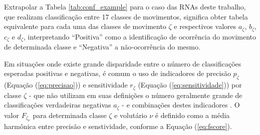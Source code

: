 \begin{table}[htb]
\end{table}

Extrapolar a Tabela \ref{tab:conf_example} para o caso das RNAs deste trabalho, que realizam classificação entre 17 classes de movimentos, significa obter tabela equivalente para cada uma das classes de movimento $\zeta$ e respectivos valores $a_\zeta$, $b_\zeta$, $c_\zeta$ e $d_\zeta$, interpretando ``Positiva'' como a identificação de ocorrência do movimento de determinada classe e ``Negativa'' a não-ocorrência do mesmo. 



Em situações onde existe grande disparidade entre o número de classificações esperadas positivas e negativas, é comum o uso de indicadores de precisão $p_\zeta$ (Equação (\ref{eq:precisao})) e sensitividade $r_\zeta$ (Equação (\ref{eq:sensitividade})) por classe $\zeta$ - que não utilizam em suas definições o número geralmente grande de classificações verdadeiras negativas $a_\zeta$ - e combinações destes indicadores \cite{Kubat1998}. O valor $F_{\zeta_{\nu}}$ para determinada classe $\zeta$ e volutário $\nu$ é definido como a média harmônica entre precisão e senstividade, conforme a Equação (\ref{eq:fscore}).

